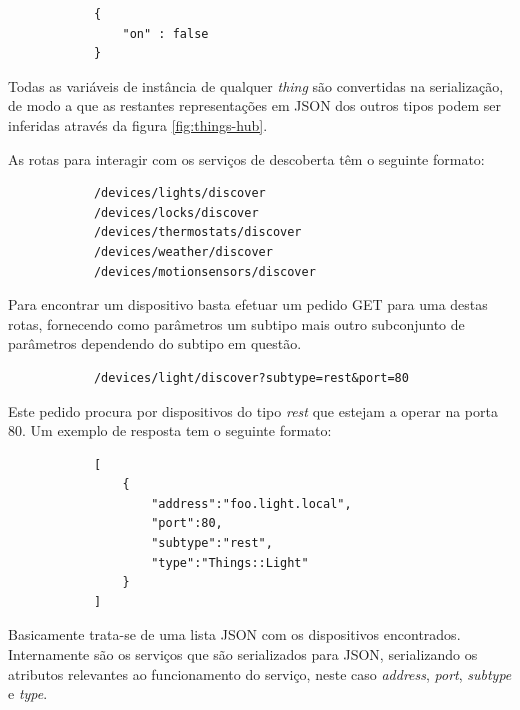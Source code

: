 \begin{verbatim}
            {
                "on" : false
            }
\end{verbatim}

Todas as variáveis de instância de qualquer \textit{thing} são convertidas na serialização, de modo a que as restantes representações em JSON dos outros tipos podem ser inferidas através da figura \ref{fig:things-hub}.

As rotas para interagir com os serviços de descoberta têm o seguinte formato:

\begin{verbatim}
            /devices/lights/discover
            /devices/locks/discover
            /devices/thermostats/discover
            /devices/weather/discover
            /devices/motionsensors/discover
\end{verbatim}

Para encontrar um dispositivo basta efetuar um pedido GET para uma destas rotas, fornecendo como parâmetros um subtipo mais outro subconjunto de parâmetros dependendo do subtipo em questão.

\begin{verbatim}
            /devices/light/discover?subtype=rest&port=80
\end{verbatim}

Este pedido procura por dispositivos do tipo \textit{rest} que estejam a operar na porta 80. Um exemplo de resposta tem o seguinte formato:

\begin{verbatim}
            [
                {
                    "address":"foo.light.local",
                    "port":80,
                    "subtype":"rest",
                    "type":"Things::Light"
                }
            ]
\end{verbatim}

Basicamente trata-se de uma lista JSON com os dispositivos encontrados. Internamente são os serviços que são serializados para JSON, serializando os atributos relevantes ao funcionamento do serviço, neste caso \textit{address}, \textit{port}, \textit{subtype} e \textit{type}.